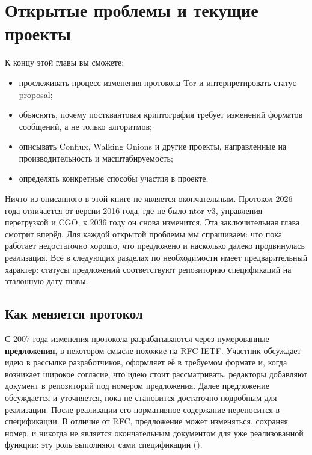 \chapter{Открытые проблемы и текущие проекты}\label{cap:31-futuro}

\begin{obiettivi}
К концу этой главы вы сможете:
\begin{itemize}[nosep]
  \item прослеживать процесс изменения протокола Tor и интерпретировать статус proposal;
  \item объяснять, почему постквантовая криптография требует изменений форматов сообщений, а не только алгоритмов;
  \item описывать Conflux, Walking Onions и другие проекты, направленные на производительность и масштабируемость;
  \item определять конкретные способы участия в проекте.
\end{itemize}
\end{obiettivi}

Ничто из описанного в этой книге не является окончательным. Протокол 2026 года отличается от версии 2016 года, где не было ntor-v3, управления перегрузкой и CGO; к 2036 году он снова изменится. Эта заключительная глава смотрит вперёд. Для каждой открытой проблемы мы спрашиваем: что пока работает недостаточно хорошо, что предложено и насколько далеко продвинулась реализация. Всё в следующих разделах по необходимости имеет предварительный характер: статусы предложений соответствуют репозиторию спецификаций на эталонную дату главы.

\section{Как меняется протокол}\label{sec:fut-processo}

С 2007 года изменения протокола разрабатываются через нумерованные \textbf{предложения}, в некотором смысле похожие на RFC IETF. Участник обсуждает идею в рассылке разработчиков, оформляет её в требуемом формате и, когда возникает широкое согласие, что идею стоит рассматривать, редакторы добавляют документ в репозиторий под номером предложения. Далее предложение обсуждается и уточняется, пока не становится достаточно подробным для реализации. После реализации его нормативное содержание переносится в спецификации. В отличие от RFC, предложение может изменяться, сохраняя номер, и никогда не является окончательным документом для уже реализованной функции: эту роль выполняют сами спецификации ().

